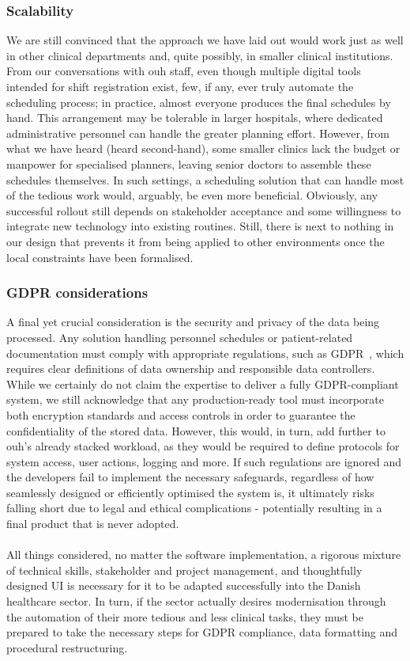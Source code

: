 \subsubsection*{Scalability}
We are still convinced that the approach we have laid out would work just as well in other clinical departments and, quite possibly, in smaller clinical institutions. From our conversations with \acrshort{ouh} staff, even though multiple digital tools intended for shift registration exist, few, if any, ever truly automate the scheduling process; in practice, almost everyone produces the final schedules by hand. This arrangement may be tolerable in larger hospitals, where dedicated administrative personnel can handle the greater planning effort. However, from what we have heard (heard second-hand), some smaller clinics lack the budget or manpower for specialised planners, leaving senior doctors to assemble these schedules themselves. In such settings, a scheduling solution that can handle most of the tedious work would, arguably, be even more beneficial. Obviously, any successful rollout still depends on stakeholder acceptance and some willingness to integrate new technology into existing routines. Still, there is next to nothing in our design that prevents it from being applied to other environments once the local constraints have been formalised.

\subsubsection*{GDPR considerations}
A final yet crucial consideration is the security and privacy of the data being processed. Any solution handling personnel schedules or patient-related documentation must comply with appropriate regulations, such as GDPR~\cite{EU-GDPR}, which requires clear definitions of data ownership and responsible data controllers. While we certainly do not claim the expertise to deliver a fully GDPR-compliant system, we still acknowledge that any production-ready tool must incorporate both encryption standards and access controls in order to guarantee the confidentiality of the stored data. However, this would, in turn, add further to \acrshort{ouh}'s already stacked workload, as they would be required to define protocols for system access, user actions, logging and more. If such regulations are ignored and the developers fail to implement the necessary safeguards, regardless of how seamlessly designed or efficiently optimised the system is, it ultimately risks falling short due to legal and ethical complications - potentially resulting in a final product that is never adopted.
\\
\\
All things considered, no matter the software implementation, a rigorous mixture of technical skills, stakeholder and project management, and thoughtfully designed UI is necessary for it to be adapted successfully into the Danish healthcare sector. In turn, if the sector actually desires modernisation through the automation of their more tedious and less clinical tasks, they must be prepared to take the necessary steps for GDPR compliance, data formatting and procedural restructuring. 